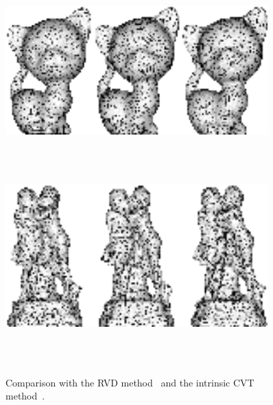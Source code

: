 \begin{figure}[tbh]
\centering
\begin{scriptsize}
\\
\end{scriptsize}
\includegraphics[width=0.9\textwidth]{figs/gcvt/comparison-kitten}\\
\begin{scriptsize}
\\
\\
\end{scriptsize}
\includegraphics[width=0.9\textwidth]{figs/gcvt/comparison-scuplture}\\
\begin{scriptsize}
\\
\\
\end{scriptsize}
\vspace{-0.1in}
\caption{Comparison with the RVD method~\cite{DBLP:journals/cgf/YanLLSW09} and the intrinsic CVT method~\cite{DBLP:journals/cad/WangYLXWGM015}.
 }
  \label{fig:OursRVDGVD}
\end{figure}


